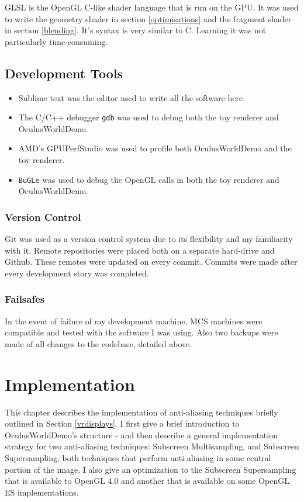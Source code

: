 \documentclass[12pt,a4paper,twoside,openright]{report}
\begin{document}
GLSL is the OpenGL C-like shader language that is run on the GPU. It was used to write the geometry shader in section \ref{optimisations} and the fragment shader in section \ref{blending}. It's syntax is very similar to C. Learning it was not particularly time-consuming.

\section{Development Tools}

\begin{itemize}
\item Sublime text was the editor used to write all the software here.

\item The C/C++ debugger \texttt{gdb} was used to debug both the toy renderer and OculusWorldDemo.

\item AMD's GPUPerfStudio was used to profile both OculusWorldDemo and the toy renderer.

\item \texttt{BuGLe} was used to debug the OpenGL calls in both the toy renderer and OculusWorldDemo.

\end{itemize}
\subsection{Version Control}

Git was used as a version control system due to its flexibility and my familiarity with it. Remote repositories were placed both on a separate hard-drive and Github. These remotes were updated on every commit. Commits were made after every development story was completed.

\subsection{Failsafes}

In the event of failure of my development machine, MCS machines were compatible and tested with the software I was using. Also two backups were made of all changes to the codebase, detailed above.

\chapter{Implementation}

This chapter describes the implementation of anti-aliasing techniques briefly outlined in Section \ref{vrdisplays}. I first give a brief introduction to OculusWorldDemo's structure - and then describe a general implementation strategy for two anti-aliasing techniques: Subscreen Multisampling, and Subscreen Supersampling, both techniques that perform anti-aliasing in some central portion of the image. I also give an optimization to the Subscreen Supersampling that is available to OpenGL 4.0 and another that is available on some OpenGL ES implementations. 
\end{document}
